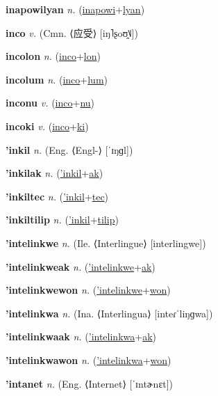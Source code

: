 \textbf{\hypertarget{inapowilyan}{inapowilyan}} \textit{n.} (\hyperlink{inapowi}{inapowi}+\allowbreak \hyperlink{lyan}{lyan})


\textbf{\hypertarget{inco}{inco}} \textit{v.} (Cmn. ⟨{\chinese{}应受}⟩ [iŋ˥ʂoʊ̯˥˩])


\textbf{\hypertarget{incolon}{incolon}} \textit{n.} (\hyperlink{inco}{inco}+\allowbreak \hyperlink{lon}{lon})


\textbf{\hypertarget{incolum}{incolum}} \textit{n.} (\hyperlink{inco}{inco}+\allowbreak \hyperlink{lum}{lum})


\textbf{\hypertarget{inconu}{inconu}} \textit{v.} (\hyperlink{inco}{inco}+\allowbreak \hyperlink{nu}{nu})


\textbf{\hypertarget{incoki}{incoki}} \textit{v.} (\hyperlink{inco}{inco}+\allowbreak \hyperlink{ki}{ki})


\textbf{\hypertarget{'inkil}{'inkil}} \textit{n.} (Eng. ⟨Engl-⟩ [ˈɪŋɡl])


\textbf{\hypertarget{'inkilak}{'inkilak}} \textit{n.} (\hyperlink{'inkil}{'inkil}+\allowbreak \hyperlink{ak}{ak})


\textbf{\hypertarget{'inkiltec}{'inkiltec}} \textit{n.} (\hyperlink{'inkil}{'inkil}+\allowbreak \hyperlink{tec}{tec})


\textbf{\hypertarget{'inkiltilip}{'inkiltilip}} \textit{n.} (\hyperlink{'inkil}{'inkil}+\allowbreak \hyperlink{tilip}{tilip})


\textbf{\hypertarget{'intelinkwe}{'intelinkwe}} \textit{n.} (Ile. ⟨Interlingue⟩ [interlingwe])


\textbf{\hypertarget{'intelinkweak}{'intelinkweak}} \textit{n.} (\hyperlink{'intelinkwe}{'intelinkwe}+\allowbreak \hyperlink{ak}{ak})


\textbf{\hypertarget{'intelinkwewon}{'intelinkwewon}} \textit{n.} (\hyperlink{'intelinkwe}{'intelinkwe}+\allowbreak \hyperlink{won}{won})


\textbf{\hypertarget{'intelinkwa}{'intelinkwa}} \textit{n.} (Ina. ⟨Interlingua⟩ [inteɾˈliŋɡwa])


\textbf{\hypertarget{'intelinkwaak}{'intelinkwaak}} \textit{n.} (\hyperlink{'intelinkwa}{'intelinkwa}+\allowbreak \hyperlink{ak}{ak})


\textbf{\hypertarget{'intelinkwawon}{'intelinkwawon}} \textit{n.} (\hyperlink{'intelinkwa}{'intelinkwa}+\allowbreak \hyperlink{won}{won})


\textbf{\hypertarget{'intanet}{'intanet}} \textit{n.} (Eng. ⟨Internet⟩ [ˈɪntɚnɛt])



